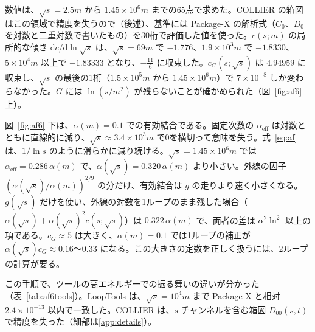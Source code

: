 \documentclass[a4paper,10pt]{ltjsarticle}
\newcommand{\dd}{\mathrm{d}}
\begin{document}
数値は、$\sqrt s=2.5m$ から $1.45\times10^6m$ までの65点で求めた。COLLIER の箱図はこの領域で精度を失うので（後述）、基準には Package-X の解析式（$C_0$、$D_0$ を対数と二重対数で書いたもの）を30桁で評価した値を使った。$c(s;m)$ の局所的な傾き $\dd c/\dd\ln\sqrt s$ は、$\sqrt s=69m$ で $-1.776$、$1.9\times10^3m$ で $-1.8330$、$5\times10^4m$ 以上で $-1.83333$ となり、$-\frac{11}{6}$ に収束した。$c_G(s;\sqrt s)$ は $4.94959$ に収束し、$\sqrt s$ の最後の1桁（$1.5\times10^5m$ から $1.45\times10^6m$）で $7\times10^{-8}$ しか変わらなかった。$G$ には $\ln(s/m^2)$ が残らないことが確かめられた（図~\ref{fig:af6} 上）。

図~\ref{fig:af6} 下は、$\alpha(m)=0.1$ での有効結合である。固定次数の $\alpha_{\mathrm{eff}}$ は対数とともに直線的に減り、$\sqrt s\approx3.4\times10^3m$ で0を横切って意味を失う。式~\eqref{eq:af} は、$1/\ln s$ のように滑らかに減り続ける。$\sqrt s=1.45\times10^6m$ では $\alpha_{\mathrm{eff}}=0.286\,\alpha(m)$ で、$\alpha(\sqrt s)=0.320\,\alpha(m)$ より小さい。外線の因子 $(\alpha(\sqrt s)/\alpha(m))^{2/9}$ の分だけ、有効結合は $g$ の走りより速く小さくなる。$g(\sqrt s)$ だけを使い、外線の対数を1ループのまま残した場合（$\alpha(\sqrt s)+\alpha(\sqrt s)^2c(s;\sqrt s)$）は $0.322\,\alpha(m)$ で、両者の差は $\alpha^2\ln^2$ 以上の項である。$c_G\approx5$ は大きく、$\alpha(m)=0.1$ では1ループの補正が $\alpha(\sqrt s)c_G\approx0.16$〜$0.33$ になる。この大きさの定数を正しく扱うには、2ループの計算が要る。

この手順で、ツールの高エネルギーでの振る舞いの違いが分かった（表~\ref{tab:af6tools}）。LoopTools は、$\sqrt s=10^4m$ まで Package-X と相対 $2.4\times10^{-13}$ 以内で一致した。COLLIER は、$s$ チャンネルを含む箱図 $D_{00}(s,t)$ で精度を失った（細部は\ref{app:details}）。
\end{document}
